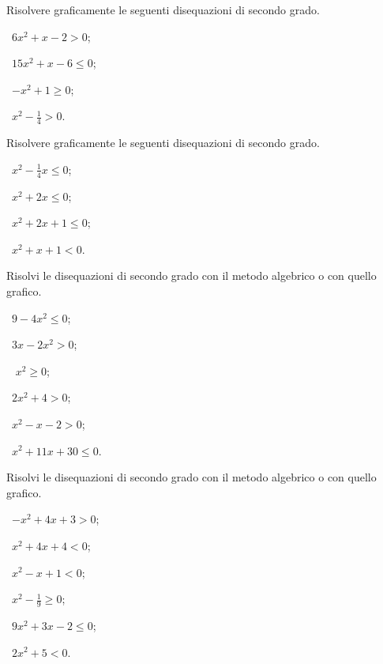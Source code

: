 \begin{esercizio}
 \label{ese:4.11}
Risolvere graficamente le seguenti disequazioni di secondo grado.
\begin{multicols}{2}
 \begin{enumeratea}
 \item~$ 6x^2+x-2>0 $;
 \item~$ 15x^2+x-6\le 0 $;
 \item~$ -x^2+1\ge 0 $;
 \item~$ x^2-\frac 1 4>0 $.
 \end{enumeratea}
 \end{multicols}
\end{esercizio}

\begin{esercizio}
 \label{ese:4.12}
Risolvere graficamente le seguenti disequazioni di secondo grado.
\begin{multicols}{2}
 \begin{enumeratea}
 \item~$ x^2-\frac 1 4x\le 0 $;
 \item~$ x^2+2x\le 0 $;
 \item~$ x^2+2x+1\le 0 $;
 \item~$ x^2+x+1<0 $.
 \end{enumeratea}
 \end{multicols}
\end{esercizio}

\begin{esercizio}[\Ast]
 \label{ese:4.13}
Risolvi le disequazioni di secondo grado con il metodo algebrico o con quello grafico.
\begin{multicols}{3}
 \begin{enumeratea}
 \item~$9-4x^2\le 0$;
 \item~$3x-2x^2>0$;
 \item~ $x^2\ge 0$;
 \item~$2x^2+4>0$;
 \item~$x^2-x-2>0$;
 \item~$x^2+11x+30\le 0$.
 \end{enumeratea}
 \end{multicols}
\end{esercizio}

\begin{esercizio}[\Ast]
 \label{ese:4.14}
Risolvi le disequazioni di secondo grado con il metodo algebrico o con quello grafico.
\begin{multicols}{3}
 \begin{enumeratea}
 \item~$-x^2+4x+3>0$;
 \item~$x^2+4x+4<0$;
 \item~$x^2-x+1<0$;
 \item~$x^2-\frac 1 9\ge 0$;
 \item~$9x^2+3x-2\le 0$;
 \item~$2x^2+5<0$.
 \end{enumeratea}
 \end{multicols}
\end{esercizio}

